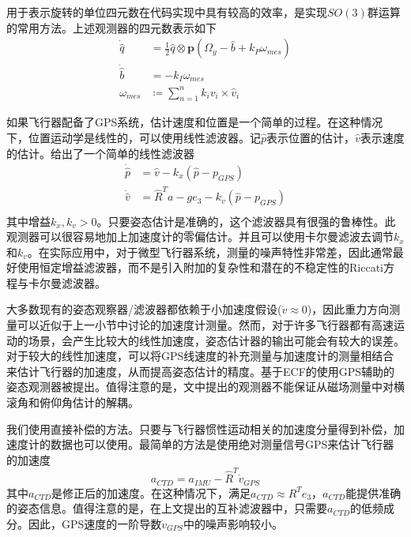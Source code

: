 \documentclass[
  type=master
]{gdutthesis}
\begin{document}
用于表示旋转的单位四元数在代码实现中具有较高的效率，是实现$SO(3)$群运算的常用方法。上述观测器的四元数表示如下
\begin{equation}\label{eq:quatfilter}
	\begin{aligned}
	\dot{\hat{q}}&=\frac{1}{2} \hat{q} \otimes \mathbf{p}(\Omega_y - \hat{b} + k_P \omega_{mes})\\
	\dot{\hat{b}}&=-k_I \omega_{mes}\\
	\omega_{mes} &\coloneqq \sum_{n=1}^{n} k_i v_i \times \hat{v}_i	
\end{aligned}
\end{equation}\par
如果飞行器配备了GPS系统，估计速度和位置是一个简单的过程。在这种情况下，位置运动学是线性的，可以使用线性滤波器。记$\hat{p}$表示位置的估计，$\hat{v}$表示速度的估计。给出了一个简单的线性滤波器
\begin{equation}\label{eq:posfilter}
	\begin{aligned}
		\dot{\hat{p}}&=\hat{v}-k_x (\hat{p}-p_{GPS})\\
		\dot{\hat{v}}&=\hat{R}^T a - g e_3 - k_v (\hat{p}-p_{GPS})\\	
	\end{aligned}
\end{equation}
其中增益$k_x,k_v > 0$。只要姿态估计是准确的，这个滤波器具有很强的鲁棒性。此观测器可以很容易地加上加速度计的零偏估计。并且可以使用卡尔曼滤波去调节$k_x$和$k_v$。在实际应用中，对于微型飞行器系统，测量的噪声特性非常差，因此通常最好使用恒定增益滤波器，而不是引入附加的复杂性和潜在的不稳定性的Riccati方程与卡尔曼滤波器。

大多数现有的姿态观察器/滤波器都依赖于小加速度假设($\dot{v}\approx 0$)，因此重力方向测量可以近似于上一小节中讨论的加速度计测量。然而，对于许多飞行器都有高速运动的场景，会产生比较大的线性加速度，姿态估计器的输出可能会有较大的误差。对于较大的线性加速度，可以将GPS线速度的补充测量与加速度计的测量相结合来估计飞行器的加速度，从而提高姿态估计的精度。基于ECF的使用GPS辅助的姿态观测器被提出\cite{hua2010attitude}。值得注意的是，文中提出的观测器不能保证从磁场测量中对横滚角和俯仰角估计的解耦。\par
我们使用直接补偿的方法。只要与飞行器惯性运动相关的加速度分量得到补偿，加速度计的数据也可以使用。最简单的方法是使用绝对测量信号GPS来估计飞行器的加速度
\begin{equation}
	a_{CTD}=a_{IMU}-\hat{R}^T \dot{v}_{GPS}
\end{equation}
其中$a_{CTD}$是修正后的加速度。在这种情况下，满足$a_{CTD} \approx R^T e_3$，$a_{CTD}$能提供准确的姿态信息。值得注意的是，在上文提出的互补滤波器中，只需要$a_{CTD}$的低频成分。因此，GPS速度的一阶导数$\dot{v}_{GPS}$中的噪声影响较小。
\end{document}
